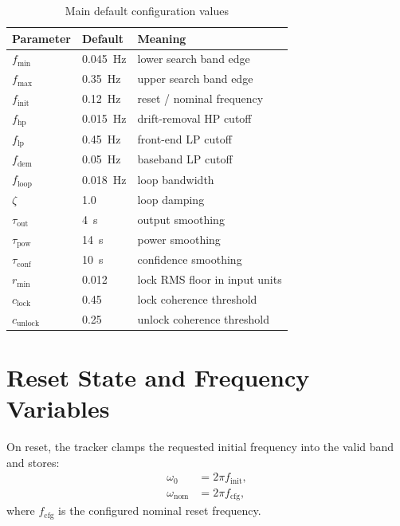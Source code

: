 \documentclass[conference]{IEEEtran}
\begin{document}
    \begin{table}[t]
        \centering
        \caption{Main default configuration values}
        \label{tab:defaults}
        \small
        \begin{tabular}{@{}lll@{}}
            \toprule
            Parameter & Default & Meaning \\
            \midrule
            \(f_{\min}\) & \SI{0.045}{Hz} & lower search band edge \\
            \(f_{\max}\) & \SI{0.35}{Hz} & upper search band edge \\
            \(f_{\mathrm{init}}\) & \SI{0.12}{Hz} & reset / nominal frequency \\
            \(f_{\mathrm{hp}}\) & \SI{0.015}{Hz} & drift-removal HP cutoff \\
            \(f_{\mathrm{lp}}\) & \SI{0.45}{Hz} & front-end LP cutoff \\
            \(f_{\mathrm{dem}}\) & \SI{0.05}{Hz} & baseband LP cutoff \\
            \(f_{\mathrm{loop}}\) & \SI{0.018}{Hz} & loop bandwidth \\
            \(\zeta\) & 1.0 & loop damping \\
            \(\tau_{\mathrm{out}}\) & \SI{4}{s} & output smoothing \\
            \(\tau_{\mathrm{pow}}\) & \SI{14}{s} & power smoothing \\
            \(\tau_{\mathrm{conf}}\) & \SI{10}{s} & confidence smoothing \\
            \(r_{\min}\) & 0.012 & lock RMS floor in input units \\
            \(c_{\mathrm{lock}}\) & 0.45 & lock coherence threshold \\
            \(c_{\mathrm{unlock}}\) & 0.25 & unlock coherence threshold \\
            \bottomrule
        \end{tabular}
    \end{table}

    \section{Reset State and Frequency Variables}

    On reset, the tracker clamps the requested initial frequency into the valid
    band and stores:
    \begin{align}
        \omega_0 &= 2\pi f_{\mathrm{init}},\\
        \omega_{\mathrm{nom}} &= 2\pi f_{\mathrm{cfg}},
    \end{align}
    where \(f_{\mathrm{cfg}}\) is the configured nominal reset frequency.
\end{document}
